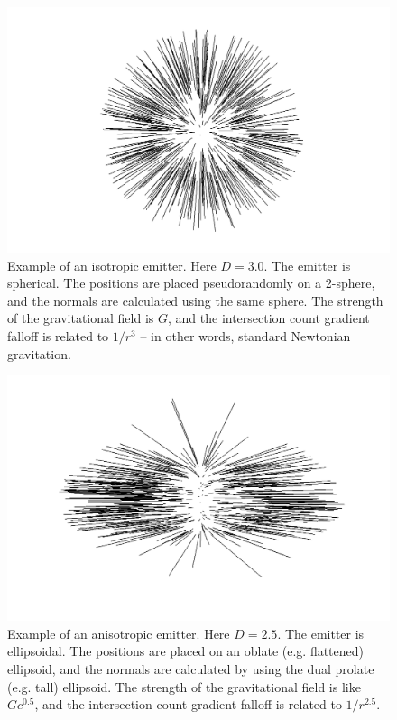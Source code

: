 \documentclass[12pt]{article}
\begin{document}
\begin{figure} 
\centering
  \includegraphics[width = 5 in]{3.png}
  \caption{
Example of an isotropic emitter.
Here $D = 3.0$. 
The emitter is spherical.
The positions are placed pseudorandomly on a 2-sphere, and the normals are calculated using the same sphere.
The strength of the gravitational field is $G$, and the intersection count gradient falloff is related to $1/r^3$ -- in other words, standard Newtonian gravitation.
}
\end{figure}


\begin{figure} 
\centering
  \includegraphics[width = 5 in]{2.5.png}
  \caption{
Example of an anisotropic emitter.
Here $D = 2.5$. 
The emitter is ellipsoidal.
The positions are placed on an oblate (e.g. flattened) ellipsoid, and the normals are calculated by using the dual prolate (e.g. tall) ellipsoid.
The strength of the gravitational field is like $G c^{0.5}$, and the intersection count gradient falloff is related to $1/r^{2.5}$.
}
\end{figure}
\end{document}

